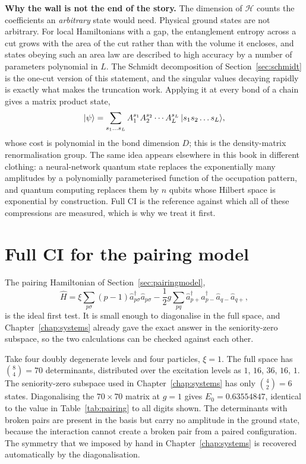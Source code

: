 \begin{notebox}
\textbf{Why the wall is not the end of the story.}  The dimension of
$\mathcal{H}$ counts the coefficients an \emph{arbitrary} state would need.
Physical ground states are not arbitrary.  For local Hamiltonians with a gap,
the entanglement entropy across a cut grows with the area of the cut rather
than with the volume it encloses, and states obeying such an area law are
described to high accuracy by a number of parameters polynomial in $L$.  The
Schmidt decomposition of Section~\ref{sec:schmidt} is the one-cut version of
this statement, and the singular values decaying rapidly is exactly what
makes the truncation work.  Applying it at every bond of a chain gives a
matrix product state,
\begin{equation}
  \vert \psi \rangle = \sum_{s_1\dots s_L}
    A^{s_1}_1A^{s_2}_2\cdots A^{s_L}_L\,\vert s_1s_2\dots s_L \rangle,
  \label{eq:5-mps}
\end{equation}
whose cost is polynomial in the bond dimension $D$; this is the density-matrix
renormalisation group.  The same idea appears elsewhere in this book in
different clothing: a neural-network quantum state replaces the exponentially
many amplitudes by a polynomially parameterised function of the occupation
pattern, and quantum computing replaces them by $n$ qubits whose Hilbert space
is exponential by construction.  Full CI is the reference against which all
of these compressions are measured, which is why we treat it first.
\end{notebox}

\section{Full CI for the pairing model}
\label{sec:fcipairing}

The pairing Hamiltonian of Section~\ref{sec:pairingmodel},
\begin{equation}
  \hat{H} = \xi\sum_{p\sigma}(p-1)\hat{a}^{\dagger}_{p\sigma}
    \hat{a}_{p\sigma}
  - \frac{1}{2}g\sum_{pq}\hat{a}^{\dagger}_{p+}\hat{a}^{\dagger}_{p-}
    \hat{a}_{q-}\hat{a}_{q+},
  \label{eq:5-pairingH}
\end{equation}
is the ideal first test.  It is small enough to diagonalise in the full
space, and Chapter~\ref{chap:systems} already gave the exact answer in the
seniority-zero subspace, so the two calculations can be checked against each
other.

Take four doubly degenerate levels and four particles, $\xi=1$.  The full
space has $\binom{8}{4}=70$ determinants, distributed over the excitation
levels as $1$, $16$, $36$, $16$, $1$.  The seniority-zero subspace used in
Chapter~\ref{chap:systems} has only $\binom{4}{2}=6$ states.  Diagonalising
the $70\times70$ matrix at $g=1$ gives $E_0=0.63554847$, identical to the
value in Table~\ref{tab:pairing} to all digits shown.  The determinants with
broken pairs are present in the basis but carry no amplitude in the ground
state, because the interaction cannot create a broken pair from a paired
configuration.  The symmetry that we imposed by hand in Chapter~\ref{chap:systems}
is recovered automatically by the diagonalisation.

